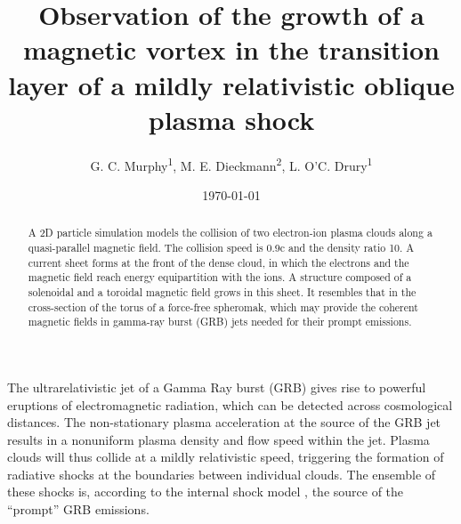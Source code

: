 \documentclass[twocolumn,showpacs,preprintnumbers,amsmath,amssymb]{revtex4}
\begin{document}

\title{Observation of the growth of a magnetic vortex in the transition layer of a mildly relativistic oblique 
plasma shock}

\author{G. C. Murphy\textsuperscript{1}, M. E. Dieckmann\textsuperscript{2}, L. O'C. 
Drury\textsuperscript{1}}



\date{\today}%

\begin{abstract}
A 2D particle simulation models the collision of two electron-ion plasma clouds along a quasi-parallel magnetic 
field. The collision speed is 0.9c and the density ratio 10. A current sheet forms at the front of the dense 
cloud, in which the electrons and the magnetic field reach energy equipartition with the ions. A structure 
composed of a solenoidal and a toroidal magnetic field grows in this sheet. It resembles that in the 
cross-section of the torus of a force-free spheromak, which may provide the coherent magnetic fields in 
gamma-ray burst (GRB) jets needed for their prompt emissions.
\end{abstract}

\maketitle

The ultrarelativistic jet of a Gamma Ray burst (GRB) gives rise to powerful eruptions 
of electromagnetic radiation, which can be detected across cosmological distances.
The non-stationary plasma acceleration at the source of the GRB jet results in a 
nonuniform plasma density and flow speed within the jet. Plasma clouds will thus 
collide at a mildly relativistic speed, triggering the formation of radiative shocks 
at the boundaries between individual clouds. The ensemble of these shocks is, according 
to the internal shock model \cite{ReMes,Piran}, the source of the ``prompt'' GRB emissions. 
\end{document}
